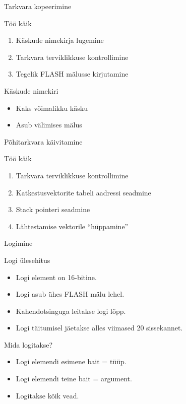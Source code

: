 \documentclass[pdf]{beamer}
\begin{document}
\begin{frame}{Tarkvara kopeerimine}
	\begin{block}{Töö käik}
		\begin{enumerate}
			\item Käskude nimekirja lugemine
			\item Tarkvara terviklikkuse kontrollimine
			\item Tegelik FLASH mälusse kirjutamine
		\end{enumerate}
	\end{block}
	\begin{block}{Käskude nimekiri}
		\begin{itemize}
			\item Kaks võimalikku käsku
			\item Asub välimises mälus
		\end{itemize}
	\end{block}
\end{frame}

\begin{frame}{Põhitarkvara käivitamine}
	\begin{block}{Töö käik}
		\begin{enumerate}
			\item Tarkvara terviklikkuse kontrollimine
			\item Katkestusvektorite tabeli aadressi seadmine
			\item Stack pointeri seadmine
			\item Lähtestamise vektorile ``hüppamine''
		\end{enumerate}
	\end{block}
\end{frame}

\begin{frame}{Logimine}
	\begin{block}{Logi ülesehitus}
		\begin{itemize}
			\item Logi element on 16-bitine.
			\item Logi asub ühes FLASH mälu lehel.
			\item Kahendotsinguga leitakse logi lõpp.
			\item Logi täitumisel jäetakse alles viimased 20 sissekannet.
		\end{itemize}
	\end{block}
	\begin{block}{Mida logitakse?}
		\begin{itemize}
			\item Logi elemendi esimene bait = tüüp.
			\item Logi elemendi teine bait = argument.
			\item Logitakse kõik vead.
		\end{itemize}
	\end{block}
\end{frame}
\end{document}
